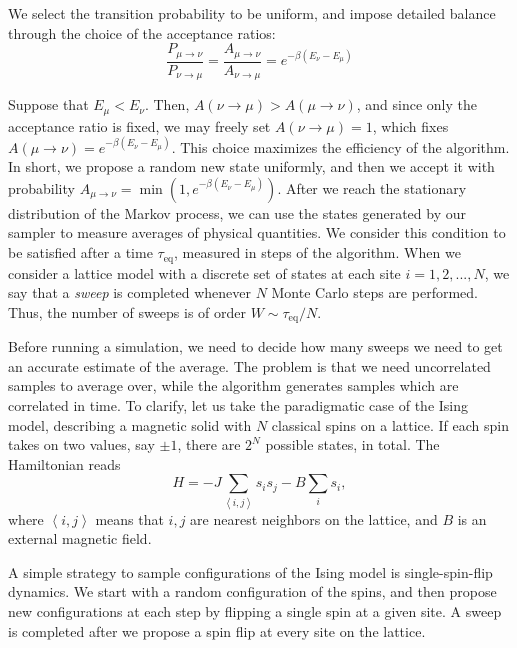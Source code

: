 We select the transition probability to be uniform, and impose detailed balance through the choice of the acceptance ratios:
\begin{equation}
\frac{ P_{\mu\rightarrow\nu }}{ P_{\nu\rightarrow\mu }} = \frac{ A_{\mu\rightarrow\nu }}{ A_{\nu\rightarrow\mu } } = e^{-\beta ( E_\nu - E_\mu )}
\end{equation}

Suppose that $E_\mu < E_\nu $.
Then, $A ( \nu \rightarrow \mu ) > A ( \mu \rightarrow \nu ) $, and since only the acceptance ratio is fixed, we may freely set $A ( \nu \rightarrow \mu ) = 1$, which fixes $A ( \mu \rightarrow \nu ) = e^{-\beta ( E_\nu - E_\mu ) }$.
This choice maximizes the efficiency of the algorithm.
In short, we propose a random new state uniformly, and then we accept it with probability $A_{\mu\rightarrow \nu} = \min (1,  e^{-\beta ( E_\nu - E_\mu )})$.
After we reach the stationary distribution of the Markov process, we can use the states generated by our sampler to measure averages of physical quantities.
We consider this condition to be satisfied after a time $\tau_{\text{eq}}$, measured in steps of the algorithm.
When we consider a lattice model with a discrete set of states at each site $i = 1, 2, ..., N$, we say that a \emph{sweep} is completed whenever $N$ Monte Carlo steps are performed.
Thus, the number of  sweeps is of order $W \sim \tau_{\text{eq}} / N$.

Before running a simulation, we need to decide how many sweeps we need to get an accurate estimate of the average.
The problem is that we need uncorrelated samples to average over, while the algorithm generates samples which are correlated in time.
To clarify, let us take the paradigmatic case of the Ising model, describing a magnetic solid with $N$ classical spins on a lattice.
If each spin takes on two values, say $\pm 1$, there are $2^N$ possible states, in total.
The Hamiltonian reads
\begin{equation}
H = - J \sum_{\left\langle i, j \right\rangle } s_i s_j - B \sum_i s_i ,
\end{equation}
where $\left\langle i, j \right\rangle$ means that $i, j $ are nearest neighbors on the lattice, and $B$ is an external magnetic field.

A simple strategy to sample configurations of the Ising model is single-spin-flip dynamics.
We start with a random configuration of the spins, and then propose new configurations at each step by flipping a single spin at a given site.
A sweep is completed after we propose a spin flip at every site on the lattice.

